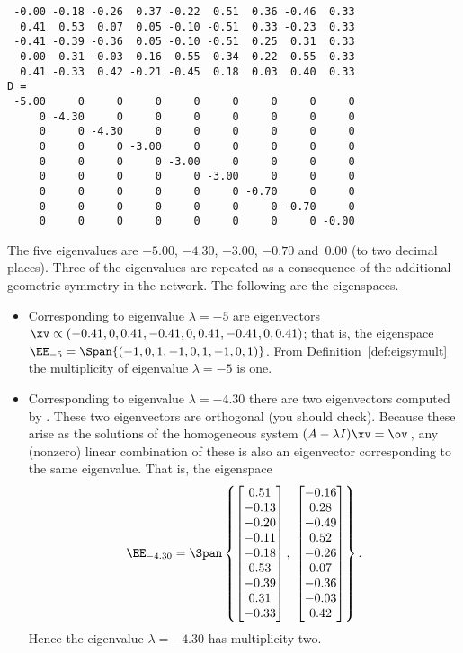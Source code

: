 \begin{example}
\begin{solution}
{\begin{verbatim}
 -0.00 -0.18 -0.26  0.37 -0.22  0.51  0.36 -0.46  0.33
  0.41  0.53  0.07  0.05 -0.10 -0.51  0.33 -0.23  0.33
 -0.41 -0.39 -0.36  0.05 -0.10 -0.51  0.25  0.31  0.33
  0.00  0.31 -0.03  0.16  0.55  0.34  0.22  0.55  0.33
  0.41 -0.33  0.42 -0.21 -0.45  0.18  0.03  0.40  0.33
D =
 -5.00     0     0     0     0     0     0     0     0
     0 -4.30     0     0     0     0     0     0     0
     0     0 -4.30     0     0     0     0     0     0
     0     0     0 -3.00     0     0     0     0     0
     0     0     0     0 -3.00     0     0     0     0
     0     0     0     0     0 -3.00     0     0     0
     0     0     0     0     0     0 -0.70     0     0
     0     0     0     0     0     0     0 -0.70     0
     0     0     0     0     0     0     0     0 -0.00
\end{verbatim}
}%
The five eigenvalues are \(-5.00\), \(-4.30\), \(-3.00\), \(-0.70\) and~\(0.00\) (to two decimal places).
Three of the eigenvalues are repeated as a consequence of the additional geometric symmetry in the network.
The following are the eigenspaces.
\begin{itemize}
\item Corresponding to eigenvalue \(\lambda=-5\) are eigenvectors \(\xv\propto(-0.41,0,0.41,-0.41,0,0.41,-0.41,0,0.41)\); that is, the eigenspace \(\EE_{-5}=\Span\{(-1,0,1,-1,0,1,-1,0,1)\}\).
From Definition~\ref{def:eigsymult} the multiplicity of eigenvalue \(\lambda=-5\) is one.

\item Corresponding to eigenvalue \(\lambda=-4.30\) there are two eigenvectors computed by \script.
These two eigenvectors are orthogonal (you should check).
Because these arise as the solutions of the homogeneous system \((A-\lambda I)\xv=\ov\)\,, any (nonzero) linear combination of these is also an eigenvector corresponding to the same eigenvalue. 
That is, the eigenspace
\begin{equation*}
\EE_{-4.30}=\Span\left\{ \begin{bmatrix} 0.51\\-0.13\\-0.20\\-0.11\\-0.18\\0.53\\-0.39\\0.31\\-0.33 \end{bmatrix},\  \begin{bmatrix} -0.16\\0.28\\-0.49\\0.52\\-0.26\\0.07\\-0.36\\-0.03\\0.42 \end{bmatrix} \right\}.
\end{equation*}
Hence the eigenvalue \(\lambda=-4.30\) has multiplicity two.


\end{itemize}
\end{solution}
\end{example}
